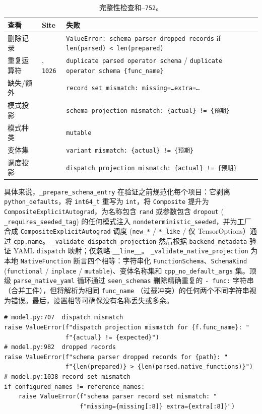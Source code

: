 \begin{table}[H]
\centering
\caption{完整性检查和--\texttt{752}。}
\label{tab:yaml_checks}
\small
\begin{tabular}{lll}
\toprule
查看 & Site & 失败 \\
\midrule
删除记录 &  & \texttt{ValueError: schema parser dropped records} if \texttt{len(parsed) < len(prepared)} \\
重复运算符 & , \texttt{1026} & \texttt{duplicate parsed operator schema} / \texttt{duplicate operator schema \{func\_name\}} \\
缺失/额外 &  & \texttt{record set mismatch: missing=\dots extra=\dots} \\
模式投影 &  & \texttt{schema projection mismatch: \{actual\} != \{预期\}} \\
模式种类 &  & \texttt{mutable} \\
变体集 &  & \texttt{variant mismatch: \{actual\} != \{预期\}} \\
调度投影 &  & \texttt{dispatch projection mismatch: \{actual\} != \{预期\}} \\
\bottomrule
\end{tabular}
\end{table}

具体来说，\texttt{\_prepare\_schema\_entry} 在验证之前规范化每个项目：它剥离 \texttt{python\_defaults}，将 \texttt{int64\_t} 重写为 \texttt{int}，将 \texttt{Composite} 提升为 \texttt{CompositeExplicitAutograd}，为名称包含 \texttt{rand} 或参数包含 \texttt{dropout} ( \texttt{\_requires\_seeded\_tag}) 的任何模式注入 \texttt{nondeterministic\_seeded}，并为工厂合成 \texttt{CompositeExplicitAutograd} 调度 (\texttt{new\_*} / \texttt{*\_like} / 仅 TensorOptions）通过 \texttt{cpp.name}。 \texttt{\_validate\_dispatch\_projection} 然后根据 \texttt{backend\_metadata} 验证 YAML \texttt{dispatch} 映射；仅忽略 \texttt{\_\_line\_\_}。 \texttt{\_validate\_native\_projection} 为本地 \texttt{NativeFunction} 断言四个相等：字符串化 \texttt{FunctionSchema}、\texttt{SchemaKind} (\texttt{functional} / \texttt{inplace} / \texttt{mutable})、变体名称集和 \texttt{cpp\_no\_default\_args} 集。顶级 \texttt{parse\_native\_yaml} 循环通过 \texttt{seen\_schemas} 删除精确重复的 \texttt{- func:} 字符串（合并工件），但将解析为相同 \texttt{func\_name} （过载冲突）的任何两个不同字符串视为错误。最后，设置相等可确保没有名称丢失或多余。

\begin{lstlisting}[caption={Completeness check diagnostics (abridged from --\texttt{1044}).}, label=lst:yamlchecks, style=pystyle]
# model.py:707  dispatch mismatch
raise ValueError(f"dispatch projection mismatch for {f.func_name}: "
                 f"{actual} != {expected}")
# model.py:982  dropped records
raise ValueError(f"schema parser dropped records for {path}: "
                 f"{len(prepared)} > {len(parsed.native_functions)}")
# model.py:1038 record set mismatch
if configured_names != reference_names:
    raise ValueError(f"schema parser record set mismatch: "
                     f"missing={missing[:8]} extra={extra[:8]}")
\end{lstlisting}

